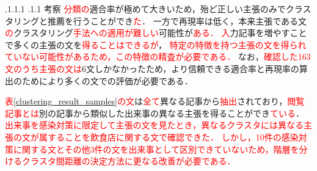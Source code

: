 \documentclass[a4paper, twocolumn, 10pt]{jarticle}
\makeatletter
\def\section{%
	\@startsection{section}{1}{\z@}%
	{.1\Cvs \@plus.1\Cdp \@minus.1\Cdp}%
	{.1\Cvs \@plus.1\Cdp}%
	{\normalfont\normalsize\bfseries}%
}
\makeatother
\begin{document}













\vspace{-3.0mm}
\section{考察}
\textcolor{red}{分類の}適合率が極めて大きいため，殆ど正しい主張のみでクラスタリングと推薦を行うことができ\textcolor{red}{た}．
一方で再現率は低く，本来主張である文\textcolor{red}{の}クラスタリング\textcolor{red}{手法への適用が難しい}可能性が\textcolor{red}{ある．}
\textcolor{red}{入}力記事を増やすことで多くの主張の文を\textcolor{red}{得ることはできるが}，
\textcolor{red}{特定の特徴を持つ主張の文を得られていない可能性があるため，この特徴の精査が必要である．}
なお，\textcolor{red}{確認した163文のうち主張の文は}6文しかなかったため，より信頼できる適合率と再現率の算出のためにより多くの文での評価が必要である．

\textcolor{red}{表\ref{clustering_result_samples}の文}は\textcolor{red}{全て}異なる記事から\textcolor{red}{抽出}されており，\textcolor{red}{閲覧記事とは}別の記事から類似した出来事の異なる主張を得ることができ\textcolor{red}{ている}．
\textcolor{red}{
出来事を感染対策に限定して主張の文を見たとき，異なるクラスタには異なる主張の文が属することを飲食店に関する文で確認できた．
しかし，10件の感染対策に関する文とその他3件の文を出来事として区別できていないため，階層を分けるクラスタ間距離の決定方法に更なる改善が必要である．
}
\end{document}
